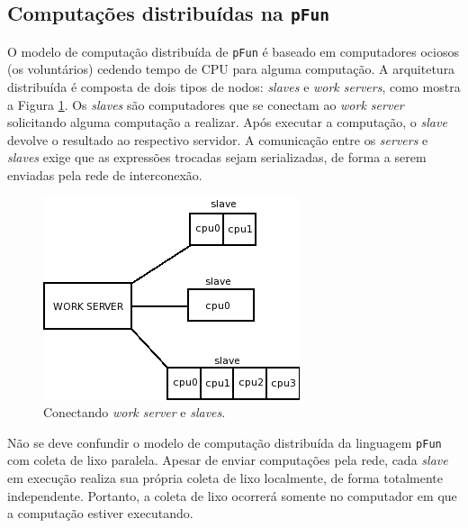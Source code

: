 \documentclass[ccc, pg2]{esinucpel}
\begin{document}
\subsection{Computações distribuídas na \texttt{pFun}}
O modelo de computação distribuída de {\tt pFun} é baseado em computadores ociosos (os voluntários) cedendo tempo de CPU para alguma computação. A arquitetura distribuída é composta de dois tipos de nodos: {\it slaves} e {\it work servers}, como mostra a Figura \ref{fig:serverslaves}. Os \textit{slaves} são computadores que se conectam ao {\it work server} solicitando alguma computação a realizar. Após executar a computação, o {\it slave} devolve o resultado ao respectivo servidor. A comunicação entre os {\it servers} e {\it slaves} exige que as expressões trocadas sejam serializadas, de forma a serem enviadas pela rede de interconexão.

\begin{figure}[htbp]
\centering
\includegraphics[width=.5\textwidth]{images/workserver_slaves.png}
\caption{Conectando {\it work server} e {\it slaves}.}
\label{fig:serverslaves}
\end{figure}

Não se deve confundir o modelo de computação distribuída da linguagem {\tt pFun} com coleta de lixo paralela. Apesar de enviar computações pela rede, cada {\it slave} em execução realiza sua própria coleta de lixo localmente, de forma totalmente independente. Portanto, a coleta de lixo ocorrerá somente no computador em que a computação estiver executando.

\end{document}

